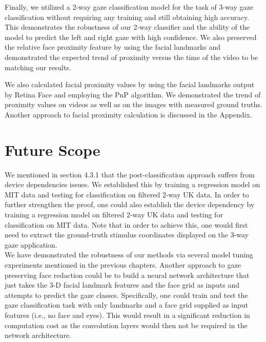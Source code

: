 Finally, we utilized a 2-way gaze classification model for the task of 3-way gaze classification without requiring any training and still obtaining high accuracy. This demonstrates the robustness of our 2-way classifier and the ability of the model to predict the left and right gaze with high confidence. We also preserved the relative face proximity feature by using the facial landmarks and demonstrated the expected trend of proximity versus the time of the video to be matching our results.

We also calculated facial proximity values by using the facial landmarks output by Retina Face and employing the PnP algorithm. We demonstrated the trend of proximity values on videos as well as on the images with measured ground truths. Another approach to facial proximity calculation is discussed in the Appendix.


\section{Future Scope}
We mentioned in section 4.3.1 that the post-classification approach suffers from device dependencies issues. We established this by training a regression model on MIT data and testing for classification on filtered 2-way UK data. In order to further strengthen the proof, one could also establish the device dependency by training a regression model on filtered 2-way UK data and testing for classification on MIT data. Note that in order to achieve this, one would first need to extract the ground-truth stimulus coordinates displayed on the 3-way gaze application.\\

We have demonstrated the robustness of our methods via several model tuning experiments mentioned in the previous chapters. Another approach to gaze preserving face redaction could be to build a neural network architecture that just takes the 3-D facial landmark features and the face grid as inputs and attempts to predict the gaze classes. Specifically, one could train and test the gaze classification task with only landmarks and a face grid supplied as input features (i.e., no face and eyes). This would result in a significant reduction in computation cost as the convolution layers would then not be required in the network architecture.